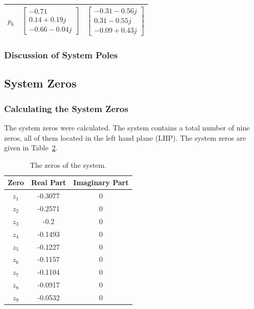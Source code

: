 \begin{table}[H]
\begin{tabular}{ccc}
		$p_6$            & $ \begin{bmatrix} -0.71 \\ 0.14 +0.19j \\ -0.66 -0.04j\end{bmatrix} $ & $ \begin{bmatrix} -0.31-0.56j \\ 0.31-0.55j \\ -0.09 +0.43j\end{bmatrix} $ \\\hline             
	\end{tabular}
	\label{tab: Pole Directions of system}
\end{table}

\subsubsection{Discussion of System Poles}

\subsection{System Zeros}

\subsubsection{Calculating the System Zeros}

The system zeros were calculated. The system contains a total number of nine zeros, all of them located in the left hand plane (LHP). The system zeros are given in Table~\ref{tab: Zeros of system}.

\begin{table}[H]
	\centering
	\caption{The zeros of the system.}
	\begin{tabular}{ccc}
		\hline
		\textbf{Zero} & \textbf{Real Part} & \textbf{Imaginary Part} \\\hline
		$z_1$            & -0.3077            & 0                       \\
		$z_2$            & -0.2571            & 0                       \\
		$z_3$            & -0.2            & 0                  \\
		$z_4$            & -0.1493            & 0                 \\
		$z_5$            & -0.1227             & 0                  \\
		$z_6$            & -0.1157             & 0   \\
		$z_7$            & -0.1104             & 0   \\
		$z_8$            & -0.0917             & 0   \\
		$z_9$            & -0.0532             & 0   \\\hline             
	\end{tabular}
	\label{tab: Zeros of system}
\end{table}

